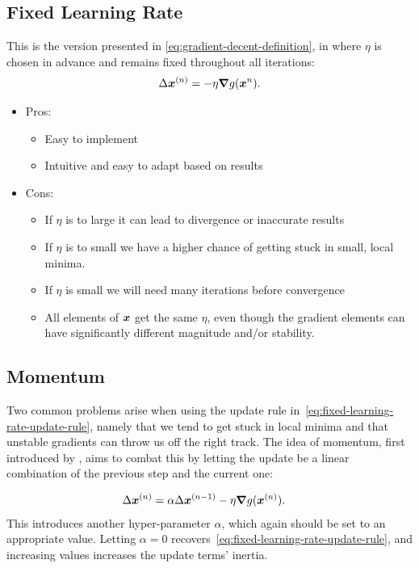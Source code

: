\documentclass[Thesis.tex]{subfiles}
\begin{document}
\subsection{Fixed Learning Rate}

This is the version presented in \cref{eq:gradient-decent-definition}, in where
$\eta$ is chosen in advance and remains fixed throughout all iterations:
\begin{align}
  \label{eq:fixed-learning-rate-update-rule}
  \Delta \bm{x}^{(n)} = -\eta \grad{g(\bm{x}^{n})}.
\end{align}

\begin{itemize}
\item Pros:
  \begin{itemize}
    \item Easy to implement
    \item Intuitive and easy to adapt based on results
  \end{itemize}
\item Cons:
  \begin{itemize}
    \item If $\eta$ is to large it can lead to divergence or inaccurate results
    \item If $\eta$ is to small we have a higher chance of getting stuck in small, local minima.
    \item If $\eta$ is small we will need many iterations before convergence
    \item All elements of $\bm{x}$ get the same $\eta$, even though the gradient
        elements can have significantly different magnitude and/or stability.
  \end{itemize}
\end{itemize}

\subsection{Momentum}

Two common problems arise when using the update rule
in~\cref{eq:fixed-learning-rate-update-rule}, namely that we tend to get stuck
in local minima and that unstable gradients can throw us off the right track.
The idea of momentum, first introduced by \textcite{Rumelhart-1986}, aims to
combat this by letting the update be a linear combination of the previous step
and the current one:

\begin{align}
  \label{eq:momentum-update-rule-def}
  \Delta\bm{x}^{(n)} &= \alpha \Delta \bm{x}^{(n-1)} - \eta \grad{g(\bm{x}^{(n)})}.
\end{align}
This introduces another hyper-parameter $\alpha$, which again should be set to
an appropriate value. Letting $\alpha=0$
recovers~\cref{eq:fixed-learning-rate-update-rule}, and increasing values
increases the update terms' inertia.
\end{document}
